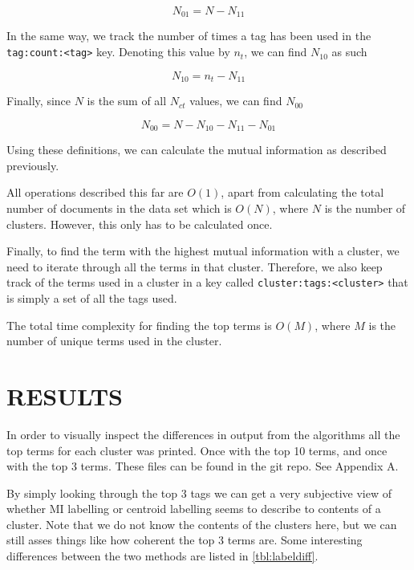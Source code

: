 \documentclass[letterpaper, 10 pt, conference]{ieeeconf}
\begin{document}
$$
N_{01} = N - N_{11}
$$

In the same way, we track the number of times a tag has been used in the
\texttt{tag:count:<tag>} key. Denoting this value by $n_t$, we can find $N_{10}$
as such

$$
N_{10} = n_t - N_11
$$

Finally, since $N$ is the sum of all $N_{ct}$ values, we can find $N_{00}$

$$
N_{00} = N - N_{10} - N_{11} - N_{01}
$$

Using these definitions, we can calculate the mutual information as described
previously.

All operations described this far are $O(1)$, apart from calculating the total
number of documents in the data set which is $O(N)$, where $N$ is the number of
clusters. However, this only has to be calculated once.

Finally, to find the term with the highest mutual information with a cluster, we
need to iterate through all the terms in that cluster. Therefore, we also keep
track of the terms used in a cluster in a key called
\texttt{cluster:tags:<cluster>} that is simply a set of all the tags used.

The total time complexity for finding the top terms is $O(M)$, where $M$ is the
number of unique terms used in the cluster.

\section{RESULTS}
In order to visually inspect the differences in output from the algorithms all
the top terms for each cluster was printed. Once with the top 10 terms, and once
with the top 3 terms. These files can be found in the git repo. See Appendix A.

By simply looking through the top 3 tags we can get a very subjective view of
whether MI labelling or centroid labelling seems to describe to contents of a
cluster. Note that we do not know the contents of the clusters here, but we can
still asses things like how coherent the top 3 terms are. Some interesting
differences between the two methods are listed in \autoref{tbl:labeldiff}.
\end{document}
